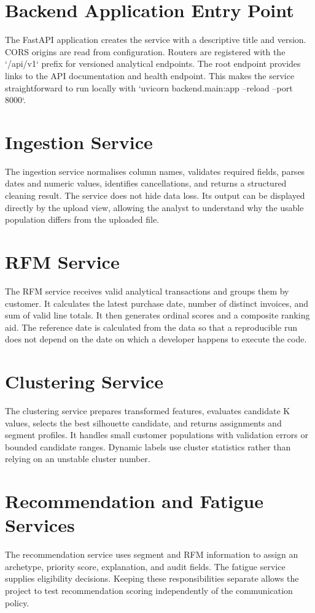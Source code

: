 \documentclass[12pt,a4paper]{report}
\begin{document}
\section{Backend Application Entry Point}
The FastAPI application creates the service with a descriptive title and version. CORS origins are read from configuration. Routers are registered with the `/api/v1` prefix for versioned analytical endpoints. The root endpoint provides links to the API documentation and health endpoint. This makes the service straightforward to run locally with `uvicorn backend.main:app --reload --port 8000`.

\section{Ingestion Service}
The ingestion service normalises column names, validates required fields, parses dates and numeric values, identifies cancellations, and returns a structured cleaning result. The service does not hide data loss. Its output can be displayed directly by the upload view, allowing the analyst to understand why the usable population differs from the uploaded file.

\section{RFM Service}
The RFM service receives valid analytical transactions and groups them by customer. It calculates the latest purchase date, number of distinct invoices, and sum of valid line totals. It then generates ordinal scores and a composite ranking aid. The reference date is calculated from the data so that a reproducible run does not depend on the date on which a developer happens to execute the code.

\section{Clustering Service}
The clustering service prepares transformed features, evaluates candidate K values, selects the best silhouette candidate, and returns assignments and segment profiles. It handles small customer populations with validation errors or bounded candidate ranges. Dynamic labels use cluster statistics rather than relying on an unstable cluster number.

\section{Recommendation and Fatigue Services}
The recommendation service uses segment and RFM information to assign an archetype, priority score, explanation, and audit fields. The fatigue service supplies eligibility decisions. Keeping these responsibilities separate allows the project to test recommendation scoring independently of the communication policy.
\end{document}
